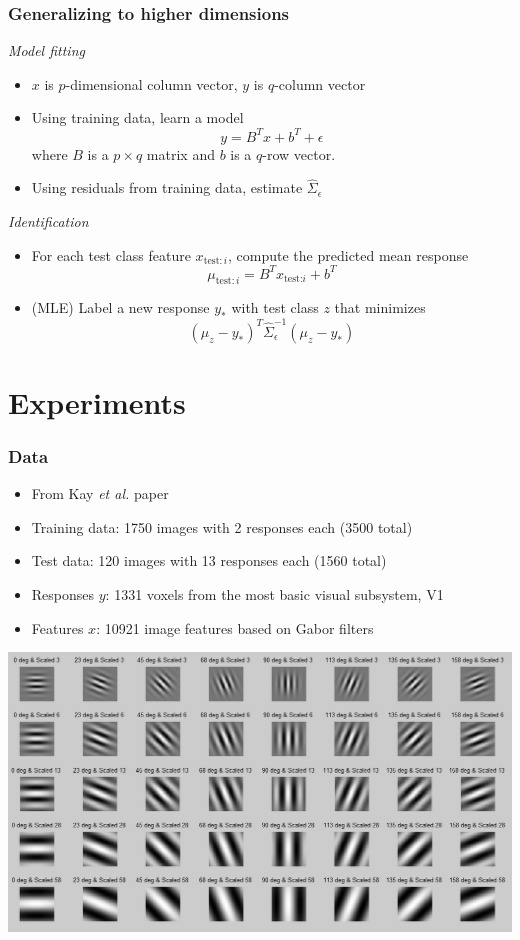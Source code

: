 \documentclass{beamer}
\begin{document}
\begin{frame}
\frametitle{Generalizing to higher dimensions}
\emph{Model fitting}
\begin{itemize}
\item $x$ is $p$-dimensional column vector, $y$ is $q$-column vector
\item Using training data, learn a model
\[
y = B^T x + b^T + \epsilon
\]
where $B$ is a $p \times q$ matrix and $b$ is a $q$-row vector.
\item Using residuals from training data, estimate $\hat{\Sigma}_\epsilon$
\end{itemize}
\emph{Identification}
\begin{itemize}
\item For each test class feature $x_{\text{test}: i}$, compute the
  predicted mean response
\[
\mu_{\text{test}: i} = B^T x_{\text{test:} i} + b^T
\]
\item (MLE) Label a new response $y_*$ with test class $z$ that minimizes
\[
(\mu_z - y_*)^T \hat{\Sigma}_\epsilon^{-1} (\mu_z - y_*)
\]
\end{itemize}
\end{frame}

\section{Experiments}
\frame{\sectionpage}

\begin{frame}
\frametitle{Data}
\begin{itemize}
\item From Kay \emph{et al.} paper
\item Training data: 1750 images with 2 responses each (3500 total)
\item Test data: 120 images with 13 responses each (1560 total)
\item Responses $y$: 1331 voxels from the most basic visual subsystem, V1
\item Features $x$: 10921 image features based on Gabor filters
\end{itemize}
\begin{center}
\includegraphics[scale = 0.3]{gabor.png}
\end{center}
\end{frame}
\end{document}
